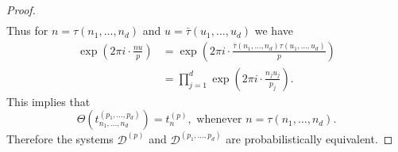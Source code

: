 \documentclass[10pt,a4paper]{amsart}
\def\ZD{\ensuremath{\mathscr D}}
\begin{document}
\begin{proof}
\begin{align*}
\end{align*}
Thus for $n=\tau(n_1,\ldots,n_d)$ and $u=\bar \tau (u_1,\ldots,u_d)$ we have
\begin{align*}
	\exp\left(2\pi i\cdot  \frac{nu}{p}\right)&=\exp\left(2\pi i\cdot  \frac{\bar\tau(n_1,\ldots,n_d) \tau(u_1,\ldots,u_d)}{p}\right)\\
	&=\prod_{j=1}^d\exp\left(2\pi i\cdot  \frac{n_j u_j}{p_j}\right).
\end{align*}
This implies that 
\begin{equation*}
	\Theta(t_{n_1,\ldots,n_d}^{(p_1,\ldots,p_d)})=t^{(p)}_n,\text{ whenever } n=\tau(n_1,\ldots,n_d). 
\end{equation*}
Therefore the systems $\ZD^{(p)}$ and $\ZD^{(p_1,\ldots,p_d)}$ are probabilistically equivalent.
\end{proof}
\end{document}
